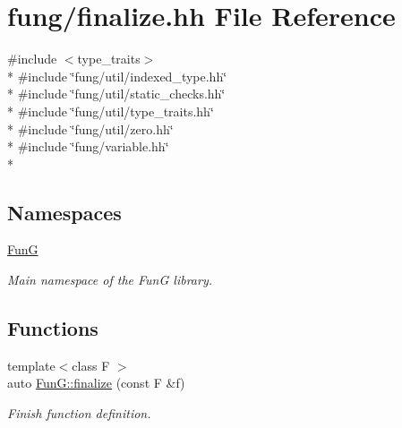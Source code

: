 \hypertarget{finalize_8hh}{}\section{fung/finalize.hh File Reference}
\label{finalize_8hh}
{\ttfamily \#include $<$type\+\_\+traits$>$}\\*
{\ttfamily \#include \char`\"{}fung/util/indexed\+\_\+type.\+hh\char`\"{}}\\*
{\ttfamily \#include \char`\"{}fung/util/static\+\_\+checks.\+hh\char`\"{}}\\*
{\ttfamily \#include \char`\"{}fung/util/type\+\_\+traits.\+hh\char`\"{}}\\*
{\ttfamily \#include \char`\"{}fung/util/zero.\+hh\char`\"{}}\\*
{\ttfamily \#include \char`\"{}fung/variable.\+hh\char`\"{}}\\*
\subsection*{Namespaces}
\begin{DoxyCompactItemize}
\item 
 \hyperlink{namespaceFunG}{Fun\+G}
\begin{DoxyCompactList}\small\item\em Main namespace of the Fun\+G library. \end{DoxyCompactList}\end{DoxyCompactItemize}
\subsection*{Functions}
\begin{DoxyCompactItemize}
\item 
{\footnotesize template$<$class F $>$ }\\auto \hyperlink{namespaceFunG_a3a2af76439713dc7635e0c538ac34f15}{Fun\+G\+::finalize} (const F \&f)
\begin{DoxyCompactList}\small\item\em Finish function definition. \end{DoxyCompactList}\end{DoxyCompactItemize}
